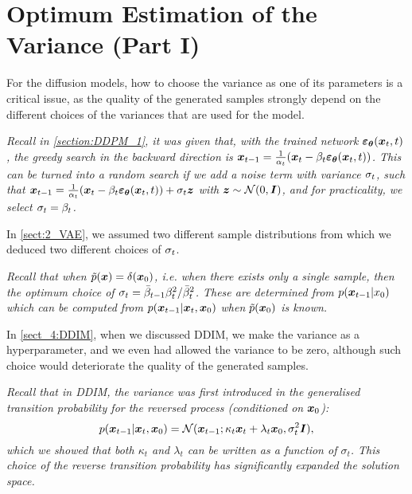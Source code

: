 \section{Optimum Estimation of the Variance (Part I)}
\label{sect7:variance_I}

For the diffusion models, how to choose the variance as one of its parameters is a critical issue, as the quality of the generated samples strongly depend on the different choices of the variances that are used for the model. 
\begin{myquote}
    \footnotesize{\textit{Recall in \cref{section:DDPM_1}, it was given that, with the trained network $\bm{\varepsilon}_{\bm{\theta}}(\bm{x}_t,t)$, the greedy search in the backward direction is $\bm{x}_{t-1}=\frac{1}{\alpha_t}(\bm{x}_{t}-\beta_t \bm{\varepsilon}_{\bm{\theta}}(\bm{x}_t,t))$. This can be turned into a random search if we add a noise term with variance $\sigma_t$, such that $\bm{x}_{t-1}=\frac{1}{\alpha_t}(\bm{x}_{t}-\beta_t \bm{\varepsilon}_{\bm{\theta}}(\bm{x}_t,t))+\sigma_t \bm{z}$ with $\bm{z}\sim\mathcal{N}(0,\bm{I})$, and for practicality, we select $\sigma_t=\beta_t$. }}
\end{myquote}
In \cref{sect:2_VAE}, we assumed two different sample distributions from which we deduced two different choices of $\sigma_t$.
\begin{myquote}
    \footnotesize{\textit{Recall that when $\tilde{p}(\bm{x})=\delta (\bm{x}_0)$, i.e. when there exists only a single sample, then the optimum choice of $\sigma_t=\bar{\beta}_{t-1}\beta_t^2/\bar{\beta}_t^2$. These are determined from $p(\bm{x}_{t-1}|x_0)$ which can be computed from $p(\bm{x}_{t-1}|\bm{x}_{t},\bm{x}_0)$ when $\tilde{p}(\bm{x}_0)$ is known.
    }}
\end{myquote}
In \cref{sect_4:DDIM}, when we discussed DDIM, we make the variance as a hyperparameter, and we even had allowed the variance to be zero, although such choice would deteriorate the quality of the generated samples.
\begin{myquote}
     \footnotesize{\textit{Recall that in DDIM, the variance was first introduced in the generalised transition probability for the reversed process (conditioned on $\bm{x}_0$):
\begin{equation*}
    p(\bm{x}_{t-1}|\bm{x}_{t},\bm{x}_0)=\mathcal{N}(\bm{x}_{t-1};\kappa_t\bm{x}_{t}+\lambda_t\bm{x}_0,\sigma_t^2\bm{I}),
\end{equation*}
which we showed that both $\kappa_t$ and $\lambda_t$ can be written as a function of $\sigma_t$. This choice of the reverse transition probability has significantly expanded the solution space.
     }}
\end{myquote}
